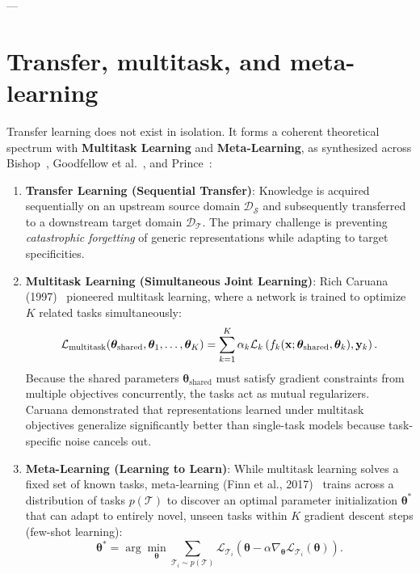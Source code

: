 ---

\section{Transfer, multitask, and meta-learning}
\label{sec:representation_learning_continuum}

Transfer learning does not exist in isolation. It forms a coherent theoretical spectrum with \textbf{Multitask Learning} and \textbf{Meta-Learning}, as synthesized across Bishop~\cite{bishop2024deep}, Goodfellow et al.~\cite{goodfellow2016deep}, and Prince~\cite{prince2023understanding}:

\begin{enumerate}[leftmargin=*]
  \item \textbf{Transfer Learning (Sequential Transfer)}: Knowledge is acquired sequentially on an upstream source domain $\mathcal{D}_{\mathcal{S}}$ and subsequently transferred to a downstream target domain $\mathcal{D}_{\mathcal{T}}$. The primary challenge is preventing \textit{catastrophic forgetting} of generic representations while adapting to target specificities.
  \item \textbf{Multitask Learning (Simultaneous Joint Learning)}: Rich Caruana (1997)~\cite{caruana1997multitask} pioneered multitask learning, where a network is trained to optimize $K$ related tasks simultaneously:
    \begin{equation}
    \mathcal{L}_{\text{multitask}}(\boldsymbol{\theta}_{\text{shared}}, \boldsymbol{\theta}_1, \dots, \boldsymbol{\theta}_K) = \sum_{k=1}^K \alpha_k \mathcal{L}_k\left( f_k(\mathbf{x}; \boldsymbol{\theta}_{\text{shared}}, \boldsymbol{\theta}_k), \mathbf{y}_k \right).
    \label{eq:multitask_loss}
    \end{equation}
    Because the shared parameters $\boldsymbol{\theta}_{\text{shared}}$ must satisfy gradient constraints from multiple objectives concurrently, the tasks act as mutual regularizers. Caruana demonstrated that representations learned under multitask objectives generalize significantly better than single-task models because task-specific noise cancels out.
  \item \textbf{Meta-Learning (Learning to Learn)}: While multitask learning solves a fixed set of known tasks, meta-learning (Finn et al., 2017)~\cite{finn2017model} trains across a distribution of tasks $p(\mathcal{T})$ to discover an optimal parameter initialization $\boldsymbol{\theta}^*$ that can adapt to entirely novel, unseen tasks within $K$ gradient descent steps (few-shot learning):
    \begin{equation}
    \boldsymbol{\theta}^* = \arg\min_{\boldsymbol{\theta}} \sum_{\mathcal{T}_i \sim p(\mathcal{T})} \mathcal{L}_{\mathcal{T}_i}\left( \boldsymbol{\theta} - \alpha \nabla_{\boldsymbol{\theta}} \mathcal{L}_{\mathcal{T}_i}(\boldsymbol{\theta}) \right).
    \label{eq:maml_meta_learning}
    \end{equation}
\end{enumerate}

